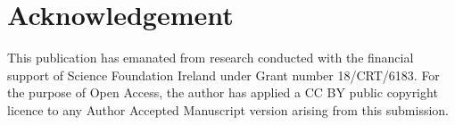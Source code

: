\documentclass{bmvc2k}
\begin{document}
\section*{Acknowledgement}
This publication has emanated from research conducted with the financial
support of Science Foundation Ireland under Grant number 18/CRT/6183. For the purpose
of Open Access, the author has applied a CC BY public copyright licence to any
Author Accepted Manuscript version arising from this submission.


\end{document}

